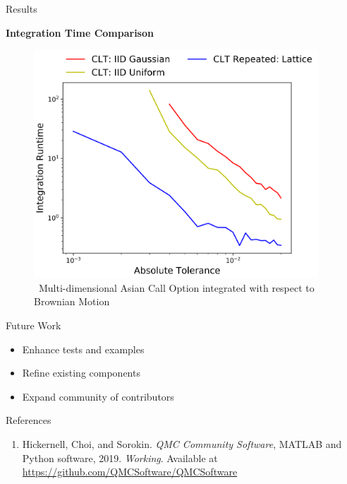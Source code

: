 \documentclass[final]{beamer}
\newcommand{\bfCenter}[1]{\centerline{\textbf{#1}}}
\newlength{\sepwid}
\newlength{\onecolwid}
\begin{document}
\begin{frame}[t]
\begin{columns}[t]
\begin{column}{\sepwid}\end{column}
\begin{column}{\onecolwid}\vspace{-.3in}
\begin{block}{Results}
    \bfCenter{Integration Time Comparison}
    \begin{figure}
        \includegraphics[width=1\textwidth]{Images/AbsTol_Runtime_LinePlot.png}
        \caption{\ Multi-dimensional Asian Call Option integrated with respect to  Brownian Motion}
    \end{figure}
\end{block}

\vspace{-.5in}
\begin{block}{Future Work}
    \begin{itemize}
        \item Enhance tests and examples 
        \item Refine existing components
        \item Expand community of contributors
    \end{itemize}
\end{block}

\begin{block}{References}
\begin{enumerate}
    
    \item Hickernell, Choi, and Sorokin. \textit{QMC Community Software}, MATLAB and Python software, 2019. \textit{Working}. Available at \url{https://github.com/QMCSoftware/QMCSoftware}
    

\end{enumerate}
\end{block}
\end{column}
\end{columns}
\end{frame}
\end{document}
